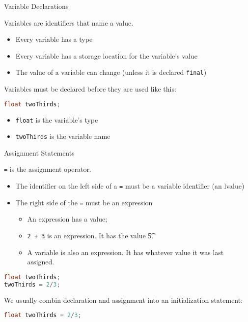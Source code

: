 \documentclass{beamer}
\begin{document}
\begin{frame}[fragile]{Variable Declarations}


Variables are identifiers that name a value.
\begin{itemize}
\item Every variable has a type
\item Every variable has a storage location for the variable's value
\item The value of a variable can change (unless it is declared {\tt final})
\end{itemize}

Variables must be declared before they are used like this:
\begin{lstlisting}[language=Java]
float twoThirds;
\end{lstlisting}
\begin{itemize}
\item {\tt float} is the variable's type
\item {\tt twoThirds} is the variable name
\end{itemize}


\end{frame}

\begin{frame}[fragile]{Assignment Statements}


{\tt =} is the assignment operator.
\begin{itemize}
\item The identifier on the left side of a {\tt =} must be a variable identifier (an lvalue)
\item The right side of the {\tt =} must be an expression
\begin{itemize}
\item An expression has a value;
\item {\tt 2 + 3} is an expression.  It has the value {\t 5}.
\item A variable is also an expression.  It has whatever value it was last assigned.
\end{itemize}

\end{itemize}

\begin{lstlisting}[language=Java]
float twoThirds;
twoThirds = 2/3;
\end{lstlisting}
We usually combin declaration and assignment into an initialization statement:
\begin{lstlisting}[language=Java]
float twoThirds = 2/3;
\end{lstlisting}


\end{frame}
\end{document}
